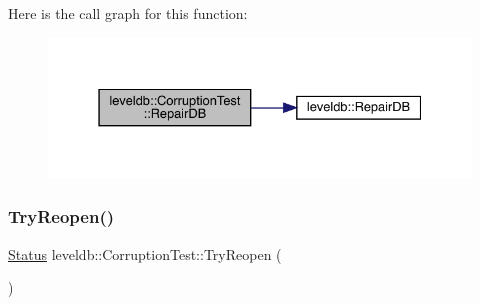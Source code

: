Here is the call graph for this function\+:
\nopagebreak
\begin{figure}[H]
\begin{center}
\leavevmode
\includegraphics[width=331pt]{classleveldb_1_1_corruption_test_aff36b45496c39a006a14df201ef7d57b_cgraph}
\end{center}
\end{figure}
\mbox{\label{classleveldb_1_1_corruption_test_aaba7c05f06400ef45d1af5cb95f66a57}} 
\subsubsection{\texorpdfstring{TryReopen()}{TryReopen()}}
{\footnotesize\ttfamily \mbox{\hyperlink{classleveldb_1_1_status}{Status}} leveldb\+::\+Corruption\+Test\+::\+Try\+Reopen (\begin{DoxyParamCaption}{ }\end{DoxyParamCaption})\hspace{0.3cm}{\ttfamily [inline]}}

